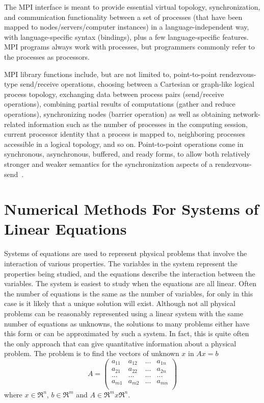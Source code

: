 The MPI interface is meant to provide essential virtual topology, 
synchronization, and communication functionality between a set of processes 
(that have been mapped to nodes/servers/computer instances) in a 
language-independent way, with language-specific syntax (bindings), plus a few 
language-specific features. MPI programs always work with processes, but 
programmers commonly refer to the processes as processors. 

MPI library functions include, but are not limited to, point-to-point 
rendezvous-type send/receive operations, choosing between a Cartesian or 
graph-like logical process topology, exchanging data between process pairs 
(send/receive operations), combining partial results of computations (gather and 
reduce operations), synchronizing nodes (barrier operation) as well as obtaining 
network-related information such as the number of processes in the computing 
session, current processor identity that a process is mapped to, neighboring 
processes accessible in a logical topology, and so on. Point-to-point operations 
come in synchronous, asynchronous, buffered, and ready forms, to allow both 
relatively stronger and weaker semantics for the synchronization aspects of a 
rendezvous-send~\cite{wiki_mpi}.

\section{Numerical Methods For Systems of Linear Equations}
\label{sec:solvers}
Systems of equations are used to represent physical problems that involve the 
interaction of various properties. The variables in the system represent the 
properties being studied, and the equations describe the interaction between the 
variables. The system is easiest to study when the equations are all linear.  
Often the number of equations is the same as the number of variables, for only 
in this case is it likely that a unique solution will exist. Although not all 
physical problems can be reasonably represented using a linear system with the 
same number of equations as unknowns, the solutions to many problems either have 
this form or can be approximated by such a system. In fact, this is quite often 
the only approach that can give quantitative information about a physical 
problem. The problem is to find the vectors of unknown $x$ in $Ax = b$
$$
A=
\begin{pmatrix}
    a_{11}&a_{12}&...&a_{1n}\\
    a_{21}&a_{22}&...&a_{2n}\\
    ...&...&...&...\\
    a_{m1}&a_{m2}&...&a_{mn}\\
\end{pmatrix}
$$
where $x \in \Re^n$, $b \in \Re^m$ and $A \in \Re^m x \Re^n$.

